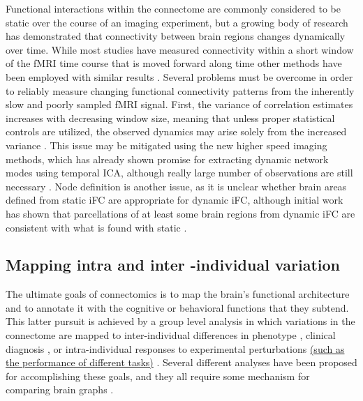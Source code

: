 \documentclass{bmcart}
\newcommand{\ADDED}[1]{\textcolor{markercolor}{\uline{#1}}}
\begin{document}
Functional interactions within the connectome are commonly considered to be static over the course of an imaging experiment, but a growing body of research has demonstrated that connectivity between brain regions changes dynamically over time\cite{Hutchison2013}. While most studies have measured connectivity within a short window of the fMRI time course that is moved forward along time \cite{Keilholz2013,Chang2010,Yang2014,Allen2014} other methods have been employed with similar results  \cite{Majeed2011,Smith2012}. Several problems must be overcome in order to reliably measure changing functional connectivity patterns from the inherently slow and poorly sampled fMRI signal. First, the variance of correlation estimates increases with decreasing window size, meaning that unless proper statistical controls are utilized, the observed dynamics may arise solely from the increased variance \cite{Handwerker2012}. This issue may be mitigated using the new higher speed imaging methods, which has already shown promise for extracting dynamic network modes using temporal ICA, although really large number of observations are still necessary \cite{Smith2012}. Node definition is another issue, as it is unclear whether brain areas defined from static iFC are appropriate for dynamic iFC, although initial work has shown that parcellations of at least some brain regions from dynamic iFC are consistent with what is found with static \cite{Yang2014}.

\subsection{Mapping intra and inter -individual variation} 

The ultimate goals of connectomics is to map the brain's functional architecture and to annotate it with the cognitive or behavioral functions that they subtend. This latter pursuit is achieved by a group level analysis in which variations in the connectome are mapped to inter-individual differences in phenotype \cite{Kelly2012}, clinical diagnosis \cite{Castellanos2013}, or intra-individual responses to experimental perturbations \ADDED{(such as the performance of different tasks)} \cite{Shirer2012,Krienen2014,Cole2014}. Several different analyses have been proposed for accomplishing these goals, and they all require some mechanism for comparing brain graphs \cite{Varoquaux2013}. 
 
\end{document}
